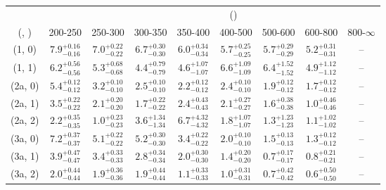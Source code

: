 \begin{table}[h!]
\tiny
\centering
{}
\begin{tabular}
{ccccccccc}
	\hline\hline
&	& \multicolumn{8}{c}{\scalht (\gev)} \\ 
	 (\njet,  \nb) & 200-250 & 250-300 & 300-350 & 350-400 & 400-500 & 500-600 & 600-800 & 800-$\infty$ \\ [0.8ex] 
\hline
	(1, 0) & $7.9^{+ 0.16 }_{- 0.16 }$ & $7.0^{+ 0.22 }_{- 0.22 }$ & $6.7^{+ 0.30 }_{- 0.30 }$ & $6.0^{+ 0.34 }_{- 0.34 }$ & $5.7^{+ 0.25 }_{- 0.25 }$ & $5.7^{+ 0.29 }_{- 0.29 }$ & $5.2^{+ 0.31 }_{- 0.31 }$ & -- \\[0.5ex] 
	(1, 1) & $6.2^{+ 0.56 }_{- 0.56 }$ & $5.3^{+ 0.68 }_{- 0.68 }$ & $4.4^{+ 0.79 }_{- 0.79 }$ & $4.6^{+ 1.07 }_{- 1.07 }$ & $6.6^{+ 1.09 }_{- 1.09 }$ & $6.4^{+ 1.52 }_{- 1.52 }$ & $4.9^{+ 1.12 }_{- 1.12 }$ & -- \\[0.5ex] 
	(2a, 0) & $5.4^{+ 0.12 }_{- 0.12 }$ & $3.2^{+ 0.10 }_{- 0.10 }$ & $2.5^{+ 0.10 }_{- 0.10 }$ & $2.2^{+ 0.12 }_{- 0.12 }$ & $2.4^{+ 0.10 }_{- 0.10 }$ & $1.9^{+ 0.12 }_{- 0.12 }$ & $1.7^{+ 0.12 }_{- 0.12 }$ & -- \\[0.5ex] 
	(2a, 1) & $3.5^{+ 0.22 }_{- 0.22 }$ & $2.1^{+ 0.20 }_{- 0.20 }$ & $1.7^{+ 0.22 }_{- 0.22 }$ & $2.4^{+ 0.43 }_{- 0.43 }$ & $2.1^{+ 0.27 }_{- 0.27 }$ & $1.6^{+ 0.38 }_{- 0.38 }$ & $1.0^{+ 0.46 }_{- 0.46 }$ & -- \\[0.5ex] 
	(2a, 2) & $2.2^{+ 0.35 }_{- 0.35 }$ & $1.0^{+ 0.23 }_{- 0.23 }$ & $3.6^{+ 1.34 }_{- 1.34 }$ & $6.7^{+ 4.32 }_{- 4.32 }$ & $1.8^{+ 1.07 }_{- 1.07 }$ & $1.3^{+ 1.23 }_{- 1.23 }$ & $1.1^{+ 1.02 }_{- 1.02 }$ & -- \\[0.5ex] 
	(3a, 0) & $7.2^{+ 0.37 }_{- 0.37 }$ & $5.1^{+ 0.22 }_{- 0.22 }$ & $5.2^{+ 0.30 }_{- 0.30 }$ & $3.4^{+ 0.22 }_{- 0.22 }$ & $2.0^{+ 0.10 }_{- 0.10 }$ & $1.5^{+ 0.13 }_{- 0.13 }$ & $1.3^{+ 0.12 }_{- 0.12 }$ & -- \\[0.5ex] 
	(3a, 1) & $3.9^{+ 0.47 }_{- 0.47 }$ & $3.4^{+ 0.33 }_{- 0.33 }$ & $2.8^{+ 0.34 }_{- 0.34 }$ & $2.0^{+ 0.30 }_{- 0.30 }$ & $1.4^{+ 0.20 }_{- 0.20 }$ & $0.7^{+ 0.17 }_{- 0.17 }$ & $0.8^{+ 0.21 }_{- 0.21 }$ & -- \\[0.5ex] 
	(3a, 2) & $2.0^{+ 0.44 }_{- 0.44 }$ & $1.9^{+ 0.36 }_{- 0.36 }$ & $1.9^{+ 0.44 }_{- 0.44 }$ & $1.1^{+ 0.33 }_{- 0.33 }$ & $1.0^{+ 0.31 }_{- 0.31 }$ & $0.7^{+ 0.42 }_{- 0.42 }$ & $0.6^{+ 0.50 }_{- 0.50 }$ & -- \\[0.5ex] 

\end{tabular}
\end{table}
